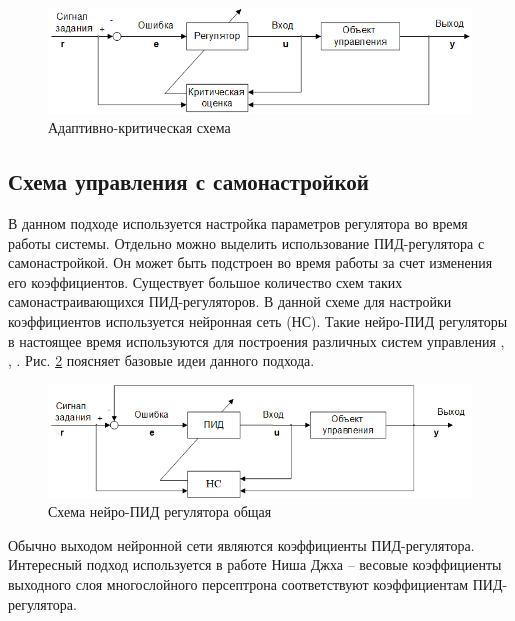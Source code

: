 \begin{figure}[H]
    \centering
    \includegraphics[width=\textwidth]{images/chapter1/Схема адаптивно-критическая.png}
    \caption{Адаптивно-критическая схема}
    \label{fig:adaptive_critic_control}
\end{figure}

\subsection{Схема управления с самонастройкой}

В данном подходе используется настройка параметров регулятора во время работы системы. Отдельно можно выделить использование ПИД-регулятора с самонастройкой. Он может быть подстроен во время работы за счет изменения его коэффициентов. Существует большое количество схем таких самонастраивающихся ПИД-регуляторов. В данной схеме для настройки коэффициентов  используется нейронная сеть (НС).
Такие нейро-ПИД регуляторы в настоящее время используются для построения различных систем управления \cite{Omatu_Khalid_Yusof}, \cite{Omatu1997}, \cite{Omatu2010}. Рис. \ref{fig:neuro_PID_control} поясняет базовые идеи данного подхода.

\begin{figure}[H]
    \centering
    \includegraphics[width=\textwidth]{images/chapter1/Схема neuroPID общая.png}
    \caption{Схема нейро-ПИД регулятора общая}
    \label{fig:neuro_PID_control}
\end{figure}

Обычно выходом нейронной сети являются коэффициенты ПИД-регулятора. Интересный подход используется в работе Ниша Джха \cite{Nisha2011} – весовые коэффициенты выходного слоя многослойного персептрона соответствуют коэффициентам ПИД-регулятора.

